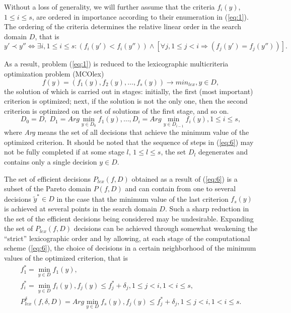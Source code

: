 \documentclass[smallextended]{svjour3}       %
\begin{document}
Without a loss of generality, we will further assume that the criteria $f_i(y)$, $1 \leq i \leq s$, are ordered in importance according to their enumeration in (\ref{eq:1}). The ordering of the criteria determines the relative linear order in the search domain $D$, that is
\begin{equation}\label{eq:4d}
y' \prec y'' \Leftrightarrow \exists i, 1 \leq i \leq s: (f_i(y')<f_i(y'')) \wedge [ \forall j, 1 \leq j <i \Rightarrow (f_j(y')=f_j(y'')) ].
\end{equation}

As a result, problem (\ref{eq:1}) is reduced to the lexicographic multicriteria optimization problem (MCOlex)
\begin{equation}\label{eq:5}
f(y) = (f_1(y), f_2(y), \dots , f_s(y)) \to min_{lex},  y \in D,
\end{equation}
the solution of which is carried out in stages: initially, the first (most important) criterion is optimized; next, if the solution is not the only one, then the second criterion is optimized on the set of solutions of the first stage, and so on.
\begin{equation}\label{eq:6}
D_0=D,\; D_1=Arg \min_{y \in D_0}{f_1(y)},\dots, D_i=Arg \min_{y \in D_{i-1}}{f_i(y)},1 \leq i \leq s,
\end{equation}
where \textit{Arg} means the set of all decisions that achieve the minimum value of the optimized criterion. It should be noted that the sequence of steps in (\ref{eq:6}) may not be fully completed if at some stage $l$, $1 \leq l \leq s$, the set $D_l$ degenerates and contains only a single decision $y \in D$.

The set of efficient decisions $P_{lex}(f,D)$ obtained as a result of (\ref{eq:6}) is a subset of the Pareto domain $P(f,D)$ and can contain from one to several decisions $\widetilde{y}^* \in D$ in the case that the minimum value of the last criterion $f_s(y)$ is achieved at several points in the search domain $D$. Such a sharp reduction in the set of the efficient decisions being considered may be undesirable. Expanding the set of $P_{lex}(f,D)$ decisions can be achieved through somewhat weakening the ``strict'' lexicographic order and by allowing, at each stage of the computational scheme (\ref{eq:6}), the choice of decisions in a certain neighborhood of the minimum values of the optimized criterion, that is
\begin{equation}\label{eq:7}
\begin{matrix}
f^*_1 =\min_{y \in D}{f_1(y)},  \\
f^*_i =\min_{y \in D}{f_i(y)},  f_j(y) \leq f^*_j + \delta_j, 1 \leq j < i, 1 < i \leq s, \\
P_{lex}^\delta(f,\delta,D) = Arg \min_{y \in D}{f_s(y)},f_j(y) \leq f^*_j + \delta_j, 1 \leq j < i, 1 < i \leq s.
\end{matrix}
\end{equation}
\end{document}

